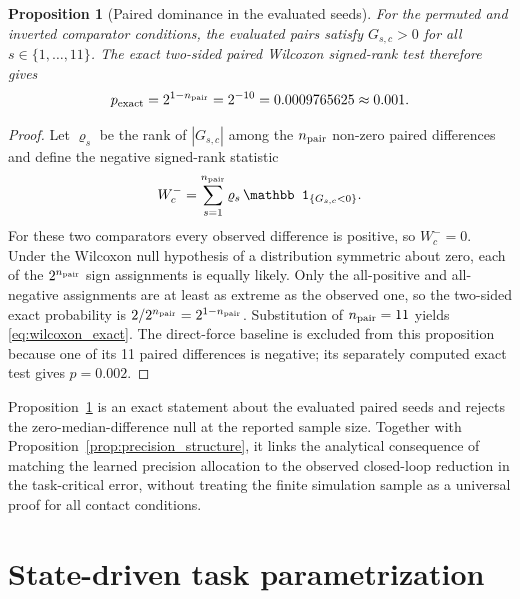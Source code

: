 \documentclass[11pt,a4paper]{article}
\newtheorem{proposition}{Proposition}
\begin{document}
\begin{proposition}[Paired dominance in the evaluated seeds]
\label{prop:paired_variance}
For the permuted and inverted comparator conditions, the evaluated pairs
satisfy $G_{s,c}>0$ for all $s\in\{1,\ldots,11\}$. The exact two-sided paired
Wilcoxon signed-rank test therefore gives
\begin{equation}
p_{\rm exact}=2^{1-n_{\rm pair}}
=2^{-10}=0.0009765625\approx0.001 .
\label{eq:wilcoxon_exact}
\end{equation}
\end{proposition}
\begin{proof}
Let $\varrho_s$ be the rank of $|G_{s,c}|$ among the
$n_{\rm pair}$ non-zero paired
differences and define the negative signed-rank statistic
\begin{equation}
W^-_c=\sum_{s=1}^{n_{\rm pair}}\varrho_s\,
\mathbb 1_{\{G_{s,c}<0\}} .
\label{eq:wilcoxon_statistic}
\end{equation}
For these two comparators every observed difference is positive, so
$W^-_c=0$. Under the Wilcoxon
null hypothesis of a distribution symmetric about zero, each of the
$2^{n_{\rm pair}}$ sign
assignments is equally likely. Only the all-positive and all-negative
assignments are at least as extreme as the observed one, so the two-sided exact
probability is
$2/2^{n_{\rm pair}}=2^{1-n_{\rm pair}}$. Substitution of
$n_{\rm pair}=11$ yields
\eqref{eq:wilcoxon_exact}. The direct-force baseline is excluded from this
proposition because one of its 11 paired differences is negative; its
separately computed exact test gives $p=0.002$.
\end{proof}

Proposition~\ref{prop:paired_variance} is an exact statement about the evaluated
paired seeds and rejects the zero-median-difference null at the reported sample
size. Together with Proposition~\ref{prop:precision_structure}, it links the
analytical consequence of matching the learned precision allocation to the
observed closed-loop reduction in the task-critical error, without treating the
finite simulation sample as a universal proof for all contact conditions.

\section{State-driven task parametrization}
\label{sec:phase}
\end{document}
